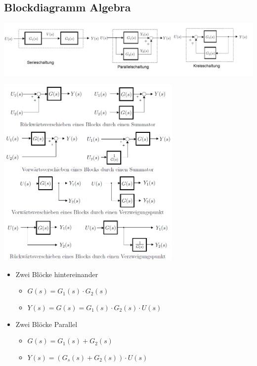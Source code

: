 \subsection{Blockdiagramm Algebra }
\begin{center}
	\includegraphics[width=16cm]{./images/blockdiagrammAlgebra.png}
\end{center}
\vspace{-1cm}\begin{multicols}{2}
\begin{center}
\includegraphics[width=9cm]{./images/blockdiagrammAlgebra2.png}
\end{center}

\columnbreak

\begin{itemize}
\item Zwei Blöcke hintereinander 
\begin{itemize}
	\item $G(s)=G_1(s)\cdot G_2(s)$
	\item $Y(s) = G(s)=G_1(s)\cdot G_2(s) \cdot U(s)$
\end{itemize}
\item Zwei Blöcke Parallel
\begin{itemize}
	\item $G(s) = G_1(s) + G_2(s)$
	\item $Y(s)= (G_s(s)+G_2(s))\cdot U(s)$
\end{itemize}


\end{itemize}
\end{multicols}
